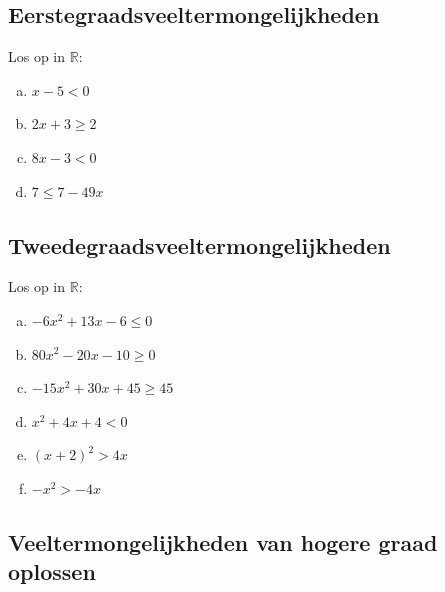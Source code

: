 \documentclass[12pt]{article}
\begin{document}
\subsection{Eerstegraadsveeltermongelijkheden}


\begin{oefening}
Los op in $\mathbb{R}$:
\begin{multicols}{2}
\begin{enumerate}[(a)]
  \itemsep0.6em
  \item $x-5<0$
  \item $2x+3\geq 2$
  \item $8x-3<0$
  \item $7\leq 7-49x$
\end{enumerate}
\end{multicols}
\end{oefening}


\subsection{Tweedegraadsveeltermongelijkheden}


\begin{oefening}
Los op in $\mathbb{R}$:
\begin{multicols}{2}
\begin{enumerate}[(a)]
  \itemsep0.6em
  \item $-6x^2+13x-6\leq 0$
  \item $80x^2-20x-10\geq 0$
  \item $-15x^2+30x+45\geq 45$
  \item $x^2+4x+4 < 0$
  \item $(x+2)^2 > 4x$
  \item $-x^2 > -4x$
\end{enumerate}
\end{multicols}
\end{oefening}



\subsection{Veeltermongelijkheden van hogere graad oplossen}
\end{document}
